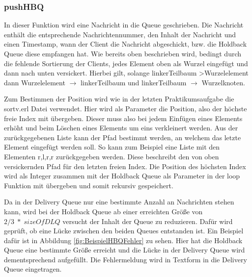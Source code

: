 \subsubsection{pushHBQ}

In dieser Funktion wird eine Nachricht in die Queue geschrieben. Die Nachricht enthält die entsprechende Nachrichtennummer, den Inhalt der Nachricht und einen Timestamp, wann der Client die Nachricht abgeschickt, bzw. die Holdback Queue diese empfangen hat. Wie bereits oben beschrieben wird, bedingt durch die fehlende Sortierung der Clients, jedes Element oben als Wurzel eingefügt und dann nach unten versickert. Hierbei gilt, solange linkerTeilbaum \textgreater Wurzelelement dann Wurzelelement $\rightarrow$ linkerTeilbaum und linkerTeilbaum $\rightarrow$ Wurzelknoten.
 
Zum Bestimmen der Position wird wie in der letzten Praktikumsaufgabe die sortv.erl Datei verwendet. Hier wird als Parameter die Position, also der höchste freie Index mit übergeben. Dieser muss also bei jedem Einfügen eines Elements erhöht und beim Löschen eines Elements um eins verkleinert werden. 
Aus der zurückgegebenen Liste kann der Pfad bestimmt werden, an welchem das letzte Element eingefügt werden soll. So kann zum Beispiel eine Liste mit den Elementen {r,l,r,r} zurückgegeben werden. Diese beschreibt den von oben versickernden Pfad für den letzten freien Index.
Die Position des höchsten Index wird als Integer zusammen mit der Holdback Queue als Parameter in der loop Funktion mit übergeben und somit rekursiv gespeichert. 

Da in der Delivery Queue nur eine bestimmte Anzahl an Nachrichten stehen kann, wird bei der Holdback Queue ab einer erreichten Größe von $2/3\;*\;sizeOfDLQ$ versucht der Inhalt der Queue zu reduzieren. Dafür wird geprüft, ob eine Lücke zwischen den beiden Queues entstanden ist. Ein Beispiel dafür ist in Abbildung \ref{fig:BeispielHBQFehler} zu sehen. Hier hat die Holdback Queue eine bestimmte Größe erreicht und die Lücke in der Delivery Queue wird dementsprechend aufgefüllt. Die Fehlermeldung wird in Textform in die Delivery Queue eingetragen.

